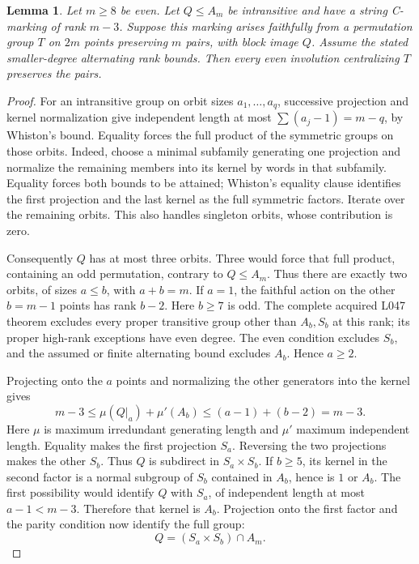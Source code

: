 \documentclass[11pt,a4paper]{article}
\newtheorem{lemma}{Lemma}
\begin{document}
\begin{lemma}\label{parityproduct}
Let $m\ge8$ be even. Let $Q\le A_m$ be intransitive and
have a string C-marking of rank $m-3$. Suppose this marking
arises faithfully from a permutation group $T$ on $2m$
points preserving $m$ pairs, with block image $Q$.
Assume the stated smaller-degree alternating rank bounds.
Then every even involution centralizing $T$ preserves the
pairs.
\end{lemma}
\begin{proof}
For an intransitive group on orbit sizes $a_1,\ldots,a_q$,
successive projection and kernel normalization give independent
length at most $\sum(a_j-1)=m-q$, by Whiston's bound.
Equality forces the full product of the symmetric groups on
those orbits. Indeed, choose a minimal subfamily generating
one projection and normalize the remaining members into its
kernel by words in that subfamily. Equality forces both
bounds to be attained; Whiston's equality clause identifies
the first projection and the last kernel as the full symmetric
factors. Iterate over the remaining orbits. This also handles
singleton orbits, whose contribution is zero.

Consequently $Q$ has at most three orbits. Three would force
that full product, containing an odd permutation, contrary
to $Q\le A_m$. Thus there are exactly two orbits, of sizes
$a\le b$, with $a+b=m$.
If $a=1$, the faithful action on the other $b=m-1$ points
has rank $b-2$. Here $b\ge7$ is odd. The complete acquired
L047 theorem excludes every proper transitive group other
than $A_b,S_b$ at this rank; its proper high-rank exceptions
have even degree. The even condition excludes $S_b$, and
the assumed or finite alternating bound excludes $A_b$.
Hence $a\ge2$.

Projecting onto the $a$ points and normalizing the other
generators into the kernel gives
\[
 m-3\le\mu(Q|_a)+\mu'(A_b)\le(a-1)+(b-2)=m-3.
\]
Here $\mu$ is maximum irredundant generating length and
$\mu'$ maximum independent length. Equality makes the
first projection $S_a$. Reversing the two projections makes
the other $S_b$. Thus $Q$ is subdirect in $S_a\times S_b$.
If $b\ge5$, its kernel in the second factor is a normal
subgroup of $S_b$ contained in $A_b$, hence is $1$ or $A_b$.
The first possibility would identify $Q$ with $S_a$, of
independent length at most $a-1<m-3$. Therefore that kernel
is $A_b$. Projection onto the first factor and the parity
condition now identify the full group:
\[
                     Q=(S_a\times S_b)\cap A_m.       \tag{1}
\]


\end{proof}
\end{document}
